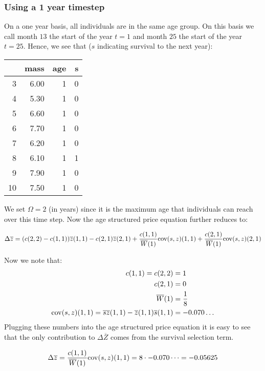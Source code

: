 \subsubsection{Using a 1 year timestep}
On a one year basis, all individuals are in the same age group. On this basis we call month $13$ the start of the year $t=1$ and month $25$ the start of the year $t=25$. Hence, we see that ($s$ indicating survival to the next year):
\begin{center}
\begin{tabular}{rrrr}
  \hline
 & mass & age & s \\ 
  \hline
3 & 6.00 &   1 &   0 \\ 
  4 & 5.30 &   1 &   0 \\ 
  5 & 6.60 &   1 &   0 \\ 
  6 & 7.70 &   1 &   0 \\ 
  7 & 6.20 &   1 &   0 \\ 
  8 & 6.10 &   1 &   1 \\ 
  9 & 7.90 &   1 &   0 \\ 
  10 & 7.50 &   1 &   0 \\ 
   \hline
\end{tabular}
\end{center}
We set $\Omega=2$ (in years) since it is the maximum age that individuals can reach over this time step. Now the age structured price equation further reduces to:

\begin{equation}
\Delta \overline{z} = (c(2,2)-c(1,1))\overline{z}(1,1) - c(2,1) \overline{z}(2,1) + \frac{c(1,1)}{\overline{W}(1)} \text{cov}(s,z)(1,1) + \frac{c(2,1)}{\overline{W}(1)} \text{cov}(s,z)(2,1)
\end{equation}

Now we note that:
\begin{align*}
c(1,1) = c(2,2) & = 1\\
c(2,1) & = 0 \\
\overline{W}(1) & = \frac{1}{8} \\
\mathrm{cov}(s,z)(1,1) = \overline{sz}(1,1) - \overline{z}(1,1)\overline{s}(1,1) & = -0.070\dots
\end{align*}
Plugging these numbers into the age structured price equation it is easy to see that the only contribution to $\Delta \overline{Z}$ comes from the survival selection term.

\begin{equation}
\Delta \overline{z} = \frac{c(1,1)}{\overline{W}(1)}\mathrm{cov}(s,z)(1,1) = 8 \cdot -0.070\dots = -0.05625
\end{equation}

